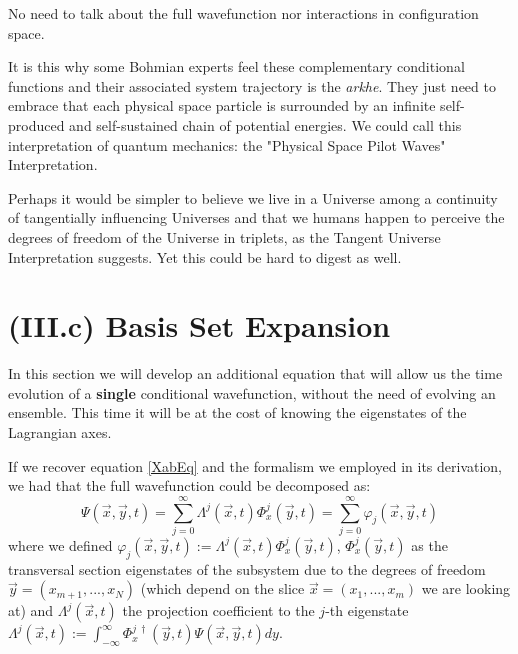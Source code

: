 \documentclass[11pt, a4paper]{article} %
\begin{document}
No need to talk about the full wavefunction nor interactions in configuration space.

It is this why some Bohmian experts feel these complementary conditional functions and  their associated system trajectory is the {\em arkhe}. They just need to embrace that each physical space particle is surrounded by an infinite self-produced and self-sustained chain of potential energies. We could call this interpretation of quantum mechanics: the "Physical Space Pilot Waves" Interpretation.

Perhaps it would be simpler to believe we live in a Universe among a continuity of tangentially influencing Universes and that we humans happen to perceive the degrees of freedom of the Universe in triplets, as the Tangent Universe Interpretation suggests. Yet this could be hard to digest as well.
\vspace{-0.25cm}

\section*{(III.c) Basis Set Expansion\vspace{-0.2cm}}
In this section we will develop an additional equation that will allow us the time evolution of a {\bf single} conditional wavefunction, without the need of evolving an ensemble. This time it will be at the cost of knowing the eigenstates of the Lagrangian axes.

If we recover equation \eqref{XabEq} and the formalism we employed in its derivation, we had that the full wavefunction could be decomposed as:
\begin{equation}
\Psi(\vec{x},\vec{y},t)=\sum_{j=0}^\infty\Lambda^j(\vec{x},t)\Phi^j_x(\vec{y},t)=\sum_{j=0}^\infty \varphi_j(\vec{x},\vec{y},t)
\end{equation}
where we defined $\varphi_j(\vec{x},\vec{y},t):=\Lambda^j(\vec{x},t)\Phi^j_x(\vec{y},t)$, $\Phi^j_x(\vec{y},t)$ as the transversal section eigenstates of the subsystem due to the degrees of freedom $\vec{y}=(x_{m+1},...,x_N)$ (which depend on the slice $\vec{x}=(x_1,...,x_m)$ we are looking at) and $\Lambda^j(\vec{x},t)$ the projection coefficient to the $j$-th eigenstate $\Lambda^j(\vec{x},t):= \int_{-\infty}^{\infty}\Phi^{j\ \dagger}_x(\vec{y},t) \Psi(\vec{x},\vec{y},t)dy$.
\end{document}
